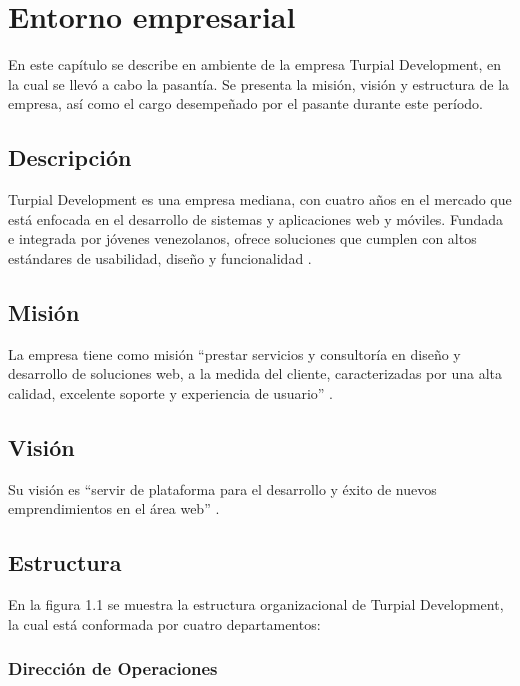 \chapter{\textbf{Entorno empresarial}}

\thispagestyle{empty}

En este capítulo se describe en ambiente de la empresa Turpial Development, en
la cual se llevó a cabo la pasantía. Se presenta la misión, visión y estructura
de la empresa, así como el cargo desempeñado por el pasante durante este
período.


\section{Descripción}

Turpial Development es una empresa mediana, con cuatro años en el mercado que
está enfocada en el desarrollo de sistemas y aplicaciones web y móviles.
Fundada e integrada por jóvenes venezolanos,  ofrece soluciones que cumplen con
altos estándares de usabilidad, diseño y funcionalidad \cite{manualTurpial}.

\section{Misión}

La empresa tiene como misión “prestar servicios y consultoría en diseño y
desarrollo de soluciones web, a la medida del cliente, caracterizadas por una
alta calidad, excelente soporte y experiencia de usuario” \cite{manualTurpial} .


\section{Visión}

Su visión es “servir de plataforma para el desarrollo y éxito de nuevos
emprendimientos en el área web” \cite{manualTurpial}.

\section{Estructura}

En la figura 1.1 se muestra la estructura organizacional de Turpial
Development, la cual está conformada por cuatro departamentos:

\subsection*{Dirección de Operaciones}

